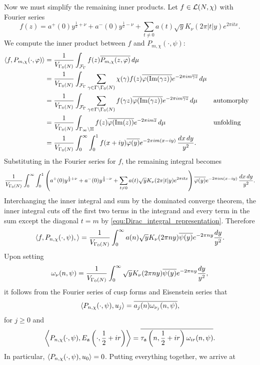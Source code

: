     Now we must simplify the remaining inner products. Let $f \in \mathcal{L}(N,\chi)$ with Fourier series
    \[
      f(z) = a^{+}(0)y^{\frac{1}{2}+\nu}+a^{-}(0)y^{\frac{1}{2}-\nu}+\sum_{t \neq 0}a(t)\sqrt{y}K_{\nu}(2\pi|t|y)e^{2\pi itx}.
    \]
    We compute the inner product between $f$ and $P_{m,\chi}(\cdot,\psi)$:
    \begin{align*}
      \langle f,P_{m,\chi}(\cdot,\varphi)\rangle &= \frac{1}{V_{\Gamma_{0}(N)}}\int_{\mathcal{F}_{\Gamma}}f(z)\overline{P_{m,\chi}(z,\varphi)}\,d\mu \\
      &= \frac{1}{V_{\Gamma_{0}(N)}}\int_{\mathcal{F}_{\Gamma}}\sum_{\gamma \in \Gamma\backslash\Gamma_{0}(N)}\chi(\gamma)f(z)\overline{\varphi(\mathrm{Im}(\gamma z))}e^{-2\pi im\overline{\gamma z}}\,d\mu \\
      &= \frac{1}{V_{\Gamma_{0}(N)}}\int_{\mathcal{F}_{\Gamma}}\sum_{\gamma \in \Gamma\backslash\Gamma_{0}(N)}f(\gamma z)\overline{\varphi(\mathrm{Im}(\gamma z))}e^{-2\pi im\overline{\gamma z}}\,d\mu && \text{automorphy} \\
      &= \frac{1}{V_{\Gamma_{0}(N)}}\int_{\Gamma_{\infty}\backslash\mathbb{H}}f(z)\overline{\varphi(\mathrm{Im}(z))}e^{-2\pi im\overline{z}}\,d\mu && \text{unfolding} \\
      &= \frac{1}{V_{\Gamma_{0}(N)}}\int_{0}^{\infty}\int_{0}^{1}f(x+iy)\overline{\varphi(y)}e^{-2\pi im(x-iy)}\,\frac{dx\,dy}{y^{2}}.
    \end{align*}
    Substituting in the Fourier series for $f$, the remaining integral becomes
    \[
      \frac{1}{V_{\Gamma_{0}(N)}}\int_{0}^{\infty}\int_{0}^{1}\left(a^{+}(0)y^{\frac{1}{2}+\nu}+a^{-}(0)y^{\frac{1}{2}-\nu}+\sum_{t \neq 0}a(t)\sqrt{y}K_{\nu}(2\pi|t|y)e^{2\pi itx}\right)\overline{\varphi(y)}e^{-2\pi im(x-iy)}\,\frac{dx\,dy}{y^{2}}.
    \]
    Interchanging the inner integral and sum by the dominated converge theorem, the inner integral cuts off the first two terms in the integrand and every term in the sum except the diagonal $t = m$ by \cref{equ:Dirac_integral_representation}. Therefore
    \[
      \langle f,P_{n,\chi}(\cdot,\psi),\rangle = \frac{1}{V_{\Gamma_{0}(N)}}\int_{0}^{\infty}a(n)\sqrt{y}K_{\nu}(2\pi ny)\overline{\psi(y)}e^{-2\pi ny}\frac{dy}{y^{2}}.
    \]
    Upon setting
    \[
      \omega_{\nu}(n,\psi) = \frac{1}{V_{\Gamma_{0}(N)}}\int_{0}^{\infty}\sqrt{y}K_{\nu}(2\pi ny)\overline{\psi(y)}e^{-2\pi ny}\frac{dy}{y^{2}},
    \]
    it follows from the Fourier series of cusp forms and Eisenstein series that
    \[
      \langle P_{n,\chi}(\cdot,\psi),u_{j}\rangle = \overline{a_{j}(n)\omega_{\nu_{j}}(n,\psi)},
    \]
    for $j \ge 0$ and
    \[
      \left\langle P_{n,\chi}(\cdot,\psi),E_{\mathfrak{a}}\left(\cdot,\frac{1}{2}+ir\right)\right\rangle = \overline{\tau_{\mathfrak{a}}\left(n,\frac{1}{2}+ir\right)\omega_{ir}(n,\psi)}.
    \]
    In particular, $\langle P_{n,\chi}(\cdot,\psi),u_{0}\rangle = 0$. Putting everything together, we arrive at
